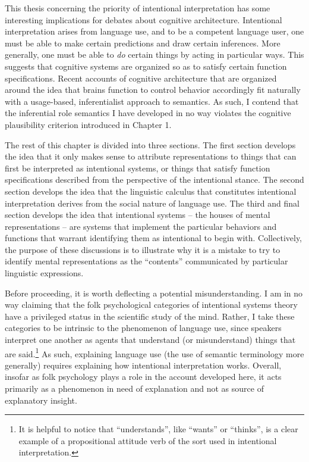 This thesis concerning the priority of intentional interpretation has some interesting implications for debates about cognitive architecture. Intentional interpretation arises from language use, and to be a competent language user, one must be able to make certain predictions and draw certain inferences. More generally, one must be able to \textit{do} certain things by acting in particular ways. This suggests that cognitive systems are organized so as to satisfy certain function specifications. Recent accounts of cognitive architecture that are organized around the idea that brains function to control behavior \citep[e.g.,][]{Eliasmith:2003,Eliasmith:2013} accordingly fit naturally with a usage-based, inferentialist approach to semantics. As such, I contend that the inferential role semantics I have developed in no way violates the cognitive plausibility criterion introduced in Chapter 1.  

The rest of this chapter is divided into three sections. The first section develops the idea that it only makes sense to attribute representations to things that can first be interpreted as intentional systems, or things that satisfy function specifications described from the perspective of the intentional stance. The second section develops the idea that the linguistic calculus that constitutes intentional interpretation derives from the social nature of language use. The third and final section develops the idea that intentional systems -- the houses of mental representations -- are systems that implement the particular behaviors and functions that warrant identifying them as intentional to begin with. Collectively, the purpose of these discussions is to illustrate why it is a mistake to try to identify mental representations as the ``contents'' communicated by particular linguistic expressions.

Before proceeding, it is worth deflecting a potential misunderstanding. I am in no way claiming that the folk psychological categories of intentional systems theory have a privileged status in the scientific study of the mind. Rather, I take these categories to be intrinsic to the phenomenon of language use, since speakers interpret one another as agents that understand (or misunderstand) things that are said.\footnote{It is helpful to notice that ``understands'', like ``wants'' or ``thinks'', is a clear example of a propositional attitude verb of the sort used in intentional interpretation.} As such, explaining language use (the use of semantic terminology more generally) requires explaining how intentional interpretation works. Overall, insofar as folk psychology plays a role in the account developed here, it acts primarily as a phenomenon in need of explanation and not as source of explanatory insight. 


